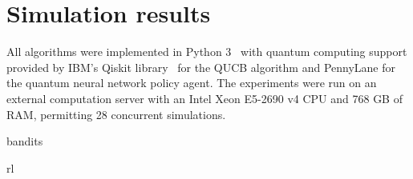 \chapter{Simulation results}
\label{chap:simulations}

All algorithms were implemented in Python 3~\autocite{python} with quantum computing support provided by IBM's Qiskit library~\autocite{qiskit} for the QUCB algorithm and PennyLane for the quantum neural network policy agent.
The experiments were run on an external computation server with an Intel Xeon E5-2690 v4 CPU and 768 GB of RAM, permitting 28 concurrent simulations.



{bandits}
\clearpage



{rl}
